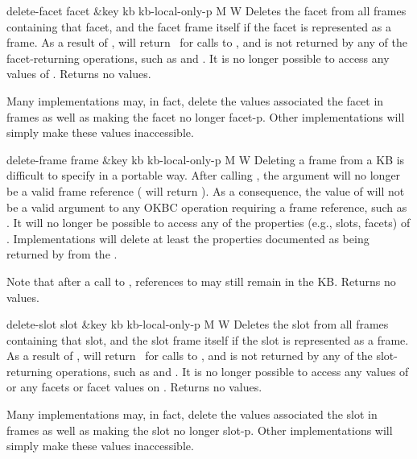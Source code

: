 \begin{okbcop}{delete-facet}{ facet \&key kb kb-local-only-p} { \void } { M } { W } {  }
Deletes the facet from all frames containing that facet, and the facet frame
   itself if the facet is represented as a frame. As a result of
   ,  will return \false\ for calls to
   , and  is not returned by any of the
   facet-returning operations, such as  and
   .  It is no longer possible to access any values of
   .  Returns no values.

   Many implementations may, in fact, delete the values associated the
   facet in frames as well as making the facet no longer facet-p.  Other
   implementations will simply make these values inaccessible.
\end{okbcop}

\begin{okbcop}{delete-frame}{ frame \&key kb kb-local-only-p} { \void } { M } { W } {  }
Deleting a frame from a KB is difficult to specify in a portable way.
   After calling , the  argument
   will no longer be a valid frame reference ( will return
   \false).  As a consequence, the value of  will
   not be a valid argument to any OKBC operation requiring a frame reference,
   such as .  It will no longer be possible to access
   any of the properties (e.g., slots, facets) of
   .  Implementations will delete at least the
   properties documented as being returned by 
   from the .

   Note that after a call to , references
   to  may still remain in the KB.  Returns no values.
\end{okbcop}

\begin{okbcop}{delete-slot}{ slot \&key kb kb-local-only-p} { \void } { M } { W } {  }
Deletes the slot from all frames containing that slot, and the slot frame
   itself if the slot is represented as a frame. As a result of
   ,  will return \false\ for calls to
   , and  is not returned by any of the
   slot-returning operations, such as  and
   .  It is no longer possible to access any values of
    or any facets or facet values on .
   Returns no values.

   Many implementations may, in fact, delete the values associated the
   slot in frames as well as making the slot no longer slot-p.  Other
   implementations will simply make these values inaccessible.
\end{okbcop}

